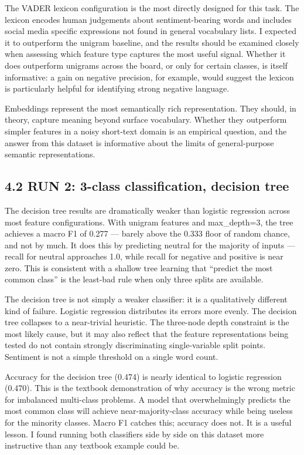 \documentclass[12pt]{article}
\begin{document}
The VADER lexicon configuration is the most directly designed for this task. The lexicon encodes human judgements about sentiment-bearing words and includes social media specific expressions not found in general vocabulary lists. I expected it to outperform the unigram baseline, and the results should be examined closely when assessing which feature type captures the most useful signal. Whether it does outperform unigrams across the board, or only for certain classes, is itself informative: a gain on negative precision, for example, would suggest the lexicon is particularly helpful for identifying strong negative language.

Embeddings represent the most semantically rich representation. They should, in theory, capture meaning beyond surface vocabulary. Whether they outperform simpler features in a noisy short-text domain is an empirical question, and the answer from this dataset is informative about the limits of general-purpose semantic representations.

\subsection*{4.2 RUN 2: 3-class classification, decision tree}

The decision tree results are dramatically weaker than logistic regression across most feature configurations. With unigram features and max\_depth=3, the tree achieves a macro F1 of 0.277 --- barely above the 0.333 floor of random chance, and not by much. It does this by predicting neutral for the majority of inputs --- recall for neutral approaches 1.0, while recall for negative and positive is near zero. This is consistent with a shallow tree learning that ``predict the most common class'' is the least-bad rule when only three splits are available.

The decision tree is not simply a weaker classifier: it is a qualitatively different kind of failure. Logistic regression distributes its errors more evenly. The decision tree collapses to a near-trivial heuristic. The three-node depth constraint is the most likely cause, but it may also reflect that the feature representations being tested do not contain strongly discriminating single-variable split points. Sentiment is not a simple threshold on a single word count.

Accuracy for the decision tree (0.474) is nearly identical to logistic regression (0.470). This is the textbook demonstration of why accuracy is the wrong metric for imbalanced multi-class problems. A model that overwhelmingly predicts the most common class will achieve near-majority-class accuracy while being useless for the minority classes. Macro F1 catches this; accuracy does not. It is a useful lesson. I found running both classifiers side by side on this dataset more instructive than any textbook example could be.
\end{document}

